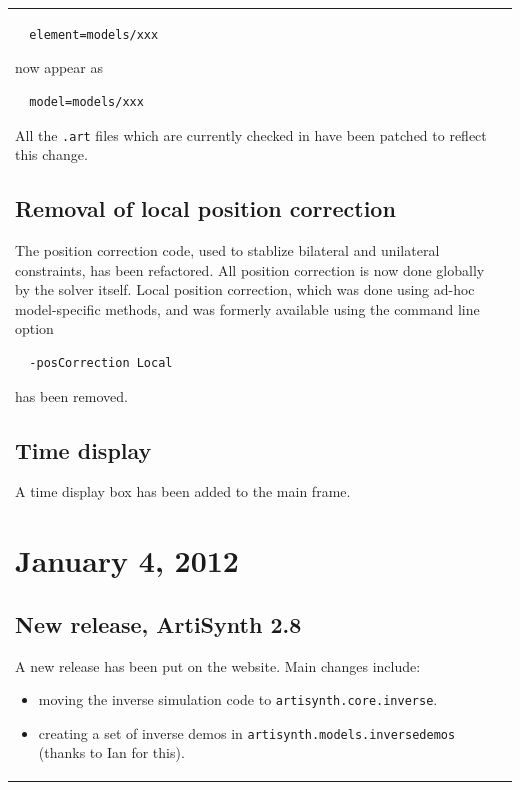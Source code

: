 \documentclass{article}
\begin{document}
\begin{tabular}{ll}
\begin{verbatim}
  element=models/xxx
\end{verbatim}

now appear as

\begin{verbatim}
  model=models/xxx
\end{verbatim}

All the {\tt .art} files which are currently checked in have been patched
to reflect this change.

\subsection*{Removal of local position correction}

The position correction code, used to stablize bilateral and
unilateral constraints, has been refactored. All position correction
is now done globally by the solver itself. Local position correction,
which was done using ad-hoc model-specific methods, and was formerly
available using the command line option

\begin{verbatim}
  -posCorrection Local
\end{verbatim}

has been removed.

\subsection*{Time display}

A time display box has been added to the main frame.

\section*{January 4, 2012}

\subsection*{New release, ArtiSynth 2.8}

A new release has been put on the website. Main changes include:

\begin{itemize}

\item moving the inverse simulation code to {\tt artisynth.core.inverse}.

\item creating a set of inverse demos in {\tt artisynth.models.inversedemos}
  (thanks to Ian for this).


\end{itemize}
\end{tabular}
\end{document}
